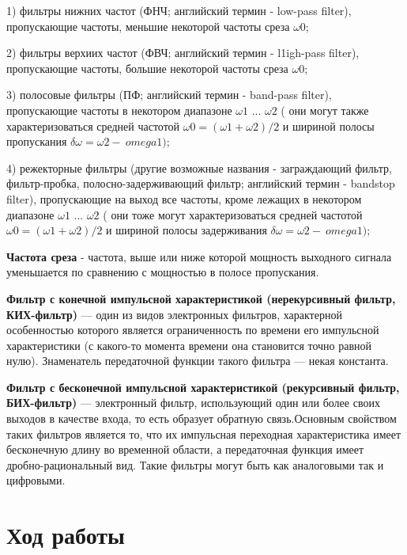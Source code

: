 \documentclass[12pt,a4paper]{scrartcl}
\begin{document}
1) фильтры нижних частот (ФНЧ; английский термин - low-pass filter), пропускающие
частоты, меньшие некоторой частоты среза $\omega 0$;

2) фильтры верхиих частот (ФВЧ; английский термин - l1igh-pass filter), пропускающие
частоты, большие некоторой частоты среза $\omega 0$;

3) полосовые фильтры (ПФ; английский термин - band-pass filter), пропускающие
частоты в некотором диапазоне $\omega 1$ ... $\omega 2$ ( они могут также характеризоваться
средней частотой $\omega 0 = (\omega 1 + \omega 2)/ 2 $ и шириной полосы пропускания $\delta \omega = \omega 2 - \ omega 1);$

4) режекторные фильтры (другие возможные названия - заграждающий фильтр,
фильтр-пробка, полосно-задерживающий фильтр; английский термин - bandstop
filter), пропускающие на выход все частоты, кроме лежащих в некотором
диапазоне $\omega 1$ ... $\omega 2$ ( они тоже могут характеризоваться средней частотой  $\omega 0 = (\omega 1 + \omega 2)/ 2 $ и шириной полосы задерживания $\delta \omega = \omega 2 - \ omega 1);$

\textbf{Частота среза} - частота, выше или ниже которой мощность выходного сигнала уменьшается по сравнению с мощностью в полосе пропускания.

\textbf{Фильтр с конечной импульсной характеристикой (нерекурсивный фильтр, КИХ-фильтр)} — один из видов электронных фильтров, характерной особенностью которого является ограниченность по времени его импульсной характеристики (с какого-то момента времени она становится точно равной нулю). Знаменатель передаточной функции такого фильтра — некая константа. 

\textbf{Фильтр с бесконечной импульсной характеристикой (рекурсивный фильтр, БИХ-фильтр)} — электронный фильтр, использующий один или более своих выходов в качестве входа, то есть образует обратную связь.Основным свойством таких фильтров является то, что их импульсная переходная характеристика имеет бесконечную длину во временной области, а передаточная функция имеет дробно-рациональный вид. Такие фильтры могут быть как аналоговыми так и цифровыми. 

\newpage

\section{Ход работы}
\label{sec:work}
\end{document}
